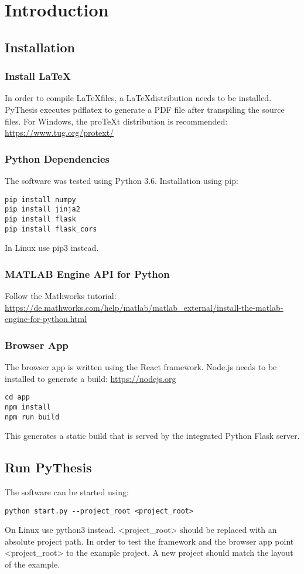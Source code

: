\chapter{Introduction}
\section{Installation}

\subsection{Install \LaTeX}
In order to compile \LaTeX files, a \LaTeX distribution needs to be installed. PyThesis executes pdflatex to generate a PDF file after transpiling the source files. For Windows, the proTeXt distribution is recommended: \url{https://www.tug.org/protext/}

\subsection{Python Dependencies}
The software was tested using Python 3.6. Installation using pip: 
\begin{verbatim}
pip install numpy
pip install jinja2
pip install flask
pip install flask_cors
\end{verbatim}
In Linux use pip3 instead.

\subsection{MATLAB Engine API for Python}
Follow the Mathworks tutorial: \url{https://de.mathworks.com/help/matlab/matlab_external/install-the-matlab-engine-for-python.html}

\subsection{Browser App}
The browser app is written using the React framework. Node.js needs to be installed to generate a build: \url{https://nodejs.org} 
\begin{verbatim}
cd app
npm install
npm run build
\end{verbatim}
This generates a static build that is served by the integrated Python Flask server.  

\section{Run PyThesis}
The software can be started using:
\begin{verbatim}
python start.py --project_root <project_root>
\end{verbatim}
On Linux use python3 instead. <project\_root> should be replaced with an absolute project path. In order to test the framework and the browser app point <project\_root> to the example project. A new project should match the layout of the example.
